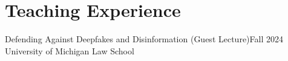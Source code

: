 \section{Teaching Experience}
  \CVSubHeadingListStart
    \CVSubheading
      {Defending Against Deepfakes and Disinformation (Guest Lecture)}{Fall 2024}
      {University of Michigan Law School}{}
  \CVSubHeadingListEnd